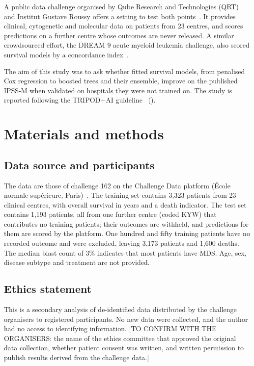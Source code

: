 \documentclass[10pt,letterpaper]{article}
\begin{document}
A public data challenge organised by Qube Research and Technologies (QRT) and Institut
Gustave Roussy offers a setting to test both points~\cite{challenge162}. It provides
clinical, cytogenetic and molecular data on patients from 23 centres, and scores
predictions on a further centre whose outcomes are never released. A similar crowdsourced
effort, the DREAM 9 acute myeloid leukemia challenge, also scored survival models by a
concordance index~\cite{noren2016}.

The aim of this study was to ask whether fitted survival models, from penalised Cox
regression to boosted trees and their ensemble, improve on the published IPSS-M when
validated on hospitals they were not trained on. The study is reported following the
TRIPOD+AI guideline~\cite{collins2024} ().

\section*{Materials and methods}

\subsection*{Data source and participants}
The data are those of challenge 162 on the Challenge Data platform (\'Ecole normale
sup\'erieure, Paris)~\cite{challenge162}. The training set contains 3,323 patients from 23
clinical centres, with overall survival in years and a death indicator. The test set
contains 1,193 patients, all from one further centre (coded KYW) that contributes no
training patients; their outcomes are withheld, and predictions for them are scored by the
platform. One hundred and fifty training patients have no recorded outcome and were
excluded, leaving 3,173 patients and 1,600 deaths. The median blast count of 3\% indicates
that most patients have MDS. Age, sex, disease subtype and treatment are not provided.

\subsection*{Ethics statement}
This is a secondary analysis of de-identified data distributed by the challenge organisers
to registered participants. No new data were collected, and the author had no access to
identifying information. [TO CONFIRM WITH THE ORGANISERS: the name of the ethics committee
that approved the original data collection, whether patient consent was written, and
written permission to publish results derived from the challenge data.]
\end{document}
